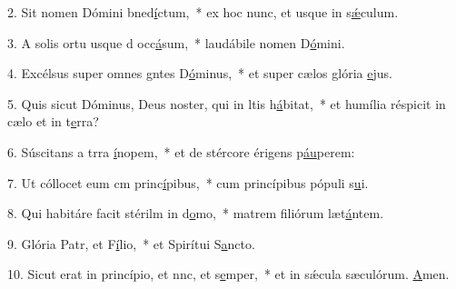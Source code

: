2. Sit nomen Dómini bned\uline{í}ctum,~* ex hoc nunc, et usque in s\uline{ǽ}culum.\par 
3. A solis ortu usque d occ\uline{á}sum,~* laudábile nomen D\uline{ó}mini.\par 
4. Excélsus super omnes gntes D\uline{ó}minus,~* et super cælos glória \uline{e}jus.\par 
5. Quis sicut Dóminus, Deus noster, qui in ltis h\uline{á}bitat,~* et humília réspicit in cælo et in t\uline{e}rra?\par 
6. Súscitans a trra \uline{í}nopem,~* et de stércore érigens p\uline{áu}perem:\par 
7. Ut cóllocet eum cm princ\uline{í}pibus,~* cum princípibus pópuli s\uline{u}i.\par 
8. Qui habitáre facit stérilm in d\uline{o}mo,~* matrem filiórum læt\uline{á}ntem.\par 
9. Glória Patr, et F\uline{í}lio,~* et Spirítui S\uline{a}ncto.\par 
10. Sicut erat in princípio, et nnc, et s\uline{e}mper,~* et in sǽcula sæculórum. \uline{A}men.\par 
